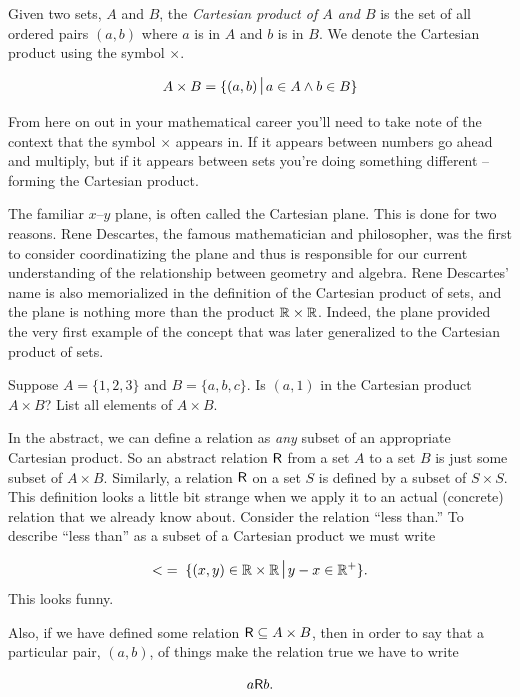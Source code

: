 Given two sets, $A$ and $B$, the 
\emph{Cartesian product of $A$ and $B$} 
is the set of all ordered pairs $(a,b)$ where $a$ is in $A$ and $b$ is in $B$.
We denote the Cartesian product using the symbol $\times$.  

\[ A \times B = \{ (a,b) \suchthat a \in A \land b \in B \} \]

\noindent From here on out
in your mathematical career you'll need to take note of the context that
the symbol $\times$ appears in.  If it appears between numbers go ahead and
multiply, but if it appears between sets you're doing something different --
forming the Cartesian product.

The familiar $x$--$y$ plane, is often called the Cartesian plane.  This
is done for two reasons. Rene Descartes, the famous
mathematician and philosopher, was the first to consider coordinatizing
the plane and thus is responsible for our current understanding of the
relationship between geometry and algebra.  Rene Descartes' name is also
memorialized in the definition of the Cartesian product of sets, and the
plane is nothing more than the product ${\mathbb R} \times {\mathbb R}$.  Indeed,
the plane provided the very first example of the concept that was later
generalized to the Cartesian product of sets.

\begin{exer}
Suppose $A = \{1,2,3\}$ and $B = \{a,b,c\}$.  Is $(a,1)$ in the Cartesian
product $A \times B$?  List all elements of $A \times B$.
\end{exer} 

In the abstract, we can define a relation as \emph{any} subset of an
appropriate Cartesian product.  So an abstract relation $\mbox{\textsf R}$ from a set 
$A$ to a set $B$ is just some subset of $A \times B$.  Similarly, a
relation $\mbox{\textsf R}$ on a set $S$ is defined by a subset of $S \times S$.
This definition looks a little bit strange when we apply it to an
actual (concrete) relation that we already know about.  Consider the
relation ``less than.''   To describe ``less than'' as a subset of
a Cartesian product we must write

\[ < \; = \; \{ (x,y) \in \Reals \times \Reals \suchthat y-x \in \Reals^+ \}.\] 
\noindent This looks funny.

Also, if we have defined some relation $\mbox{\textsf R} \subseteq A \times B$, then in order
to say that a particular pair, $(a,b)$, of things make the relation true we
have to write 

\[ a\mbox{\textsf R} b. \]

